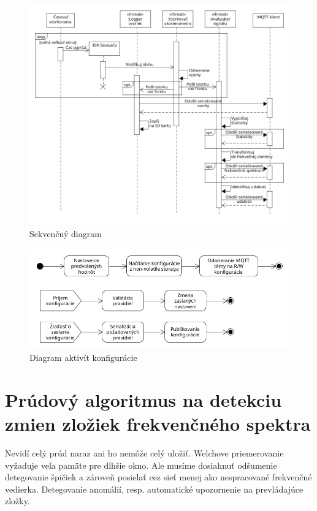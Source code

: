 \begin{figure}[h]
	\centering
	\includegraphics[width=\textwidth]{figures/design/tasks.png}
	\caption{Sekvenčný diagram}
\end{figure}

\begin{figure}[h]
	\centering
	\includegraphics[width=\textwidth]{figures/design/configuration.png}
	\caption{Diagram aktivít konfigurácie}
\end{figure}

\section{Prúdový algoritmus na detekciu zmien zložiek frekvenčného spektra}
Nevidí celý prúd naraz ani ho nemôže celý uložiť. Welchove priemerovanie vyžaduje veľa pamäte pre dlhšie okno.
Ale musíme dosiahnuť odšumenie detegovanie špičiek a zároveň posielať cez sieť menej ako nespracované
frekvenčné vedierka. Detegovanie anomálií, resp. automatické upozornenie na prevládajúce zložky.

